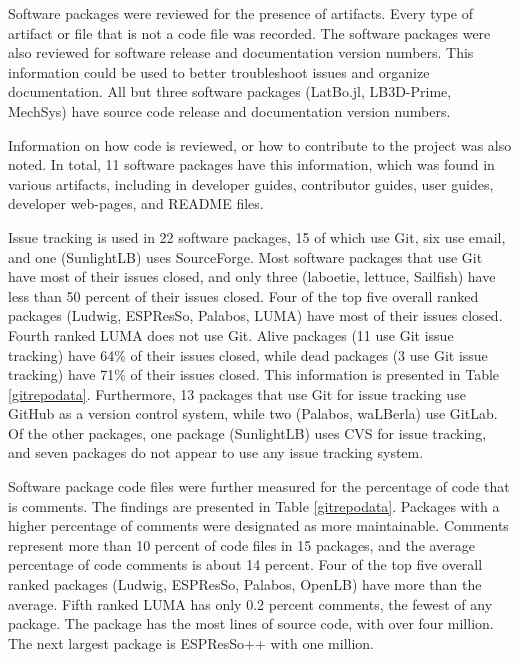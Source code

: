\documentclass[12pt, notitlepage]{article}
\begin{document}
Software packages were reviewed for the presence of artifacts. Every type of artifact or file that is not a code file was recorded. The software packages were also reviewed for software release and documentation version numbers. This information could be used to better troubleshoot issues and organize documentation. All but three software packages (LatBo.jl, LB3D-Prime, MechSys) have source code release and documentation version numbers.

Information on how code is reviewed, or how to contribute to the project was also noted. In total, 11 software packages have this information, which was found in various artifacts, including in developer guides, contributor guides, user guides, developer web-pages, and README files. 

Issue tracking is used in 22 software packages, 15 of which use Git, six use email, and one (SunlightLB) uses SourceForge. Most software packages that use Git have most of their issues closed, and only three (laboetie, lettuce, Sailfish) have less than 50 percent of their issues closed. Four of the top five overall ranked packages (Ludwig, ESPResSo, Palabos, LUMA) have most of their issues closed. Fourth ranked LUMA does not use Git. Alive packages (11 use Git issue tracking) have 64\% of their issues closed, while dead packages (3 use Git issue tracking) have 71\% of their issues closed. This information is presented in Table \ref{gitrepodata}. Furthermore, 13 packages that use Git for issue tracking use GitHub as a version control system, while two (Palabos, waLBerla) use GitLab. Of the other packages, one package (SunlightLB) uses CVS for issue tracking, and seven packages do not appear to use any issue tracking system.

Software package code files were further measured for the percentage of code that is comments. The findings are presented in Table \ref{gitrepodata}. Packages with a higher percentage of comments were designated as more maintainable. Comments represent more than 10 percent of code files in 15 packages, and the average percentage of code comments is about 14 percent. Four of the top five overall ranked packages (Ludwig, ESPResSo, Palabos, OpenLB) have more than the average. Fifth ranked LUMA has only 0.2 percent comments, the fewest of any package. The package has the most lines of source code, with over four million. The next largest package is ESPResSo++ with one million.
\end{document}
